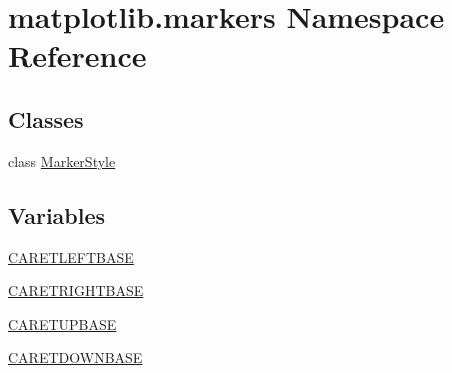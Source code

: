 \hypertarget{namespacematplotlib_1_1markers}{}\section{matplotlib.\+markers Namespace Reference}
\label{namespacematplotlib_1_1markers}
\subsection*{Classes}
\begin{DoxyCompactItemize}
\item 
class \hyperlink{classmatplotlib_1_1markers_1_1MarkerStyle}{Marker\+Style}
\end{DoxyCompactItemize}
\subsection*{Variables}
\begin{DoxyCompactItemize}
\item 
\hyperlink{namespacematplotlib_1_1markers_a8b13ef1a96196c1aae3bdf759e792898}{C\+A\+R\+E\+T\+L\+E\+F\+T\+B\+A\+SE}
\item 
\hyperlink{namespacematplotlib_1_1markers_a3fa2dc502a4db698f3c55f5f50cd36d6}{C\+A\+R\+E\+T\+R\+I\+G\+H\+T\+B\+A\+SE}
\item 
\hyperlink{namespacematplotlib_1_1markers_a7f46f8c348a1df6afe29403e32e15017}{C\+A\+R\+E\+T\+U\+P\+B\+A\+SE}
\item 
\hyperlink{namespacematplotlib_1_1markers_ad59a941a1c452731fa5d0fa01f163891}{C\+A\+R\+E\+T\+D\+O\+W\+N\+B\+A\+SE}
\end{DoxyCompactItemize}


